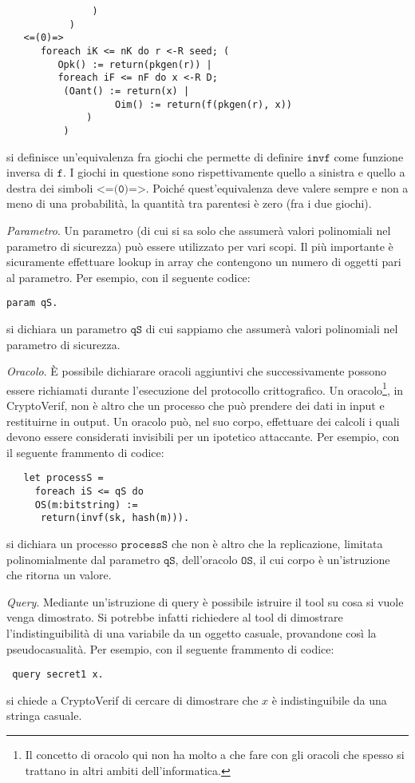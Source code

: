 \documentclass[a4paper,openright,twoside,12pt]{report}
\begin{document}
\begin{description}
\begin{verbatim}
               )
           )
   <=(0)=>
      foreach iK <= nK do r <-R seed; (
         Opk() := return(pkgen(r)) |
         foreach iF <= nF do x <-R D;
          (Oant() := return(x) |
                   Oim() := return(f(pkgen(r), x))
              )
          )
 \end{verbatim}
si definisce un'equivalenza fra giochi che permette di definire $\texttt{invf}$ come funzione inversa di $\texttt{f}$. I giochi in questione sono rispettivamente quello a sinistra e quello a destra dei simboli $\texttt{<=(0)=>}$.
Poich\'e quest'equivalenza deve valere sempre e non a meno di una probabilit\`a, la quantit\`a tra parentesi \`e zero (fra i due giochi). 
 \item{\emph{Parametro}.} Un parametro (di cui si sa solo che assumer\`a valori polinomiali nel parametro di sicurezza) pu\`o essere utilizzato per vari scopi.
		  Il pi\`u importante \`e sicuramente effettuare lookup in array che contengono un numero di oggetti pari al parametro.
Per esempio, con il seguente codice:
\begin{verbatim}
param qS.
\end{verbatim}
si dichiara un parametro $\texttt{qS}$ di cui sappiamo che assumer\`a valori polinomiali nel parametro di sicurezza.	    
 \item{\emph{Oracolo}.} \`E possibile dichiarare oracoli aggiuntivi che successivamente possono essere richiamati durante l'esecuzione
			  del protocollo crittografico. Un oracolo\footnote{Il concetto di oracolo qui non ha molto a che fare con gli oracoli che spesso si trattano in altri ambiti dell'informatica.}, in CryptoVerif, non \`e altro che un processo che pu\`o prendere
			  dei dati in input e restituirne in output. Un oracolo pu\`o, nel suo corpo, effettuare dei calcoli i quali devono
			  essere considerati invisibili per un ipotetico attaccante. Per esempio, con il seguente frammento di codice:
 \begin{verbatim}
   let processS =
     foreach iS <= qS do
     OS(m:bitstring) :=
      return(invf(sk, hash(m))).
 \end{verbatim}
si dichiara un processo $\texttt{processS}$ che non \`e altro che la replicazione, limitata polinomialmente dal parametro $\texttt{qS}$, dell'oracolo $\texttt{OS}$, il cui corpo \`e un'istruzione che ritorna un valore.
 \item{\emph{Query}.} Mediante un'istruzione di query \`e possibile istruire il tool su cosa si vuole venga dimostrato. Si potrebbe infatti richiedere
		    al tool di dimostrare l'indistinguibilit\`a di una variabile da un oggetto casuale, provandone cos\`i la pseudocasualit\`a.	Per esempio, con il seguente frammento di codice:
\begin{verbatim}
 query secret1 x.
\end{verbatim}
si chiede a CryptoVerif di cercare di dimostrare che $x$ \`e indistinguibile da una stringa casuale.
\end{description}
\end{document}

